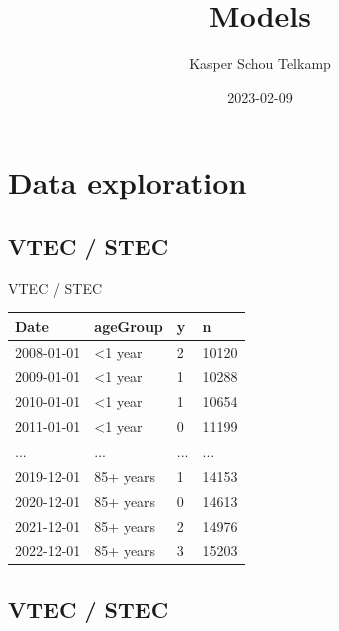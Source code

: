 \documentclass[aspectratio=169]{beamer}
\title[Automated and Early Detection of Disease Outbreaks]{Models}
\author{Kasper Schou Telkamp}
\institute{Section for Dynamical Systems}
\date{2023-02-09}
\begin{document}
\frame{
	\maketitle
}


\hypertarget{data-exploration}{%
\section{Data exploration}\label{data-exploration}}

\hypertarget{vtec-stec}{%
\subsection*{VTEC / STEC}\label{vtec-stec}}

\begin{frame}{VTEC / STEC}
\tiny

\begin{table}
\centering\begingroup\fontsize{12}{14}\selectfont

\begin{tabular}{llll}
\toprule
Date & ageGroup & y & n\\
\midrule
2008-01-01 & <1 year & 2 & 10120\\
2009-01-01 & <1 year & 1 & 10288\\
2010-01-01 & <1 year & 1 & 10654\\
2011-01-01 & <1 year & 0 & 11199\\
... & ... & ... & ...\\
2019-12-01 & 85+ years & 1 & 14153\\
2020-12-01 & 85+ years & 0 & 14613\\
2021-12-01 & 85+ years & 2 & 14976\\
2022-12-01 & 85+ years & 3 & 15203\\
\bottomrule
\end{tabular}
\endgroup{}
\end{table}

\normalsize
\end{frame}

\hypertarget{vtec-stec-1}{%
\subsection{VTEC / STEC}\label{vtec-stec-1}}
\end{document}
